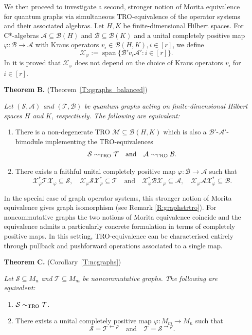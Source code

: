 \documentclass[11pt]{amsart}
\numberwithin{equation}{section}
\theoremstyle{plain}
\theoremstyle{definition}
\theoremstyle{remark}
\newcommand{\A}{{\mathcal{A}}}
\newcommand{\B}{{\mathcal{B}}}
\newcommand{\M}{{\mathcal{M}}}
\renewcommand{\S}{{\mathcal{S}}}
\newcommand{\T}{{\mathcal{T}}}
\newcommand{\X}{{\mathcal{X}}}
\newcommand\vphi{\varphi}
\newcommand{\qand}{\quad\text{and}\quad}
\newcommand{\spn}{\operatorname{span}}
\begin{document}
We then proceed to investigate a second, stronger notion of Morita equivalence for quantum graphs via simultaneous TRO-equivalence of the operator systems and their associated algebras. Let $H,K$ be finite-dimensional Hilbert spaces. For C*-algebras $\A\subseteq \B(H)$ and $\B\subseteq \B(K)$ and a unital completely positive map $\vphi \colon \B \to \A$ with Kraus operators $v_i \in \B(H,K), i\in[r]$, we define 
\[
\X_{\vphi}:= \spn\{\B' v_i \A':i\in [r]\}.
\]
In \cite[Proposition 6.1]{KL26} it is proved that $\X_\vphi$ does not depend on the choice of Kraus operators $v_i$ for $i\in [r]$.

\medskip

\noindent
{\bf Theorem B.} (Theorem~\ref{T:qgraphs_balanced})
{ \it Let $(\S,\A)$ and $(\T,\B)$ be quantum graphs acting on finite-dimensional Hilbert spaces
$H$ and $K$, respectively. The following are equivalent:
\begin{enumerate}
\item There is a non-degenerate TRO $\M\subseteq \B(H,K)$ which is also a $\B'$-$\A'$-bimodule implementing the TRO-equivalences
\[
\S \sim_{\rm TRO } \T \qand \A \sim_{\rm TRO } \B.
\]

\item There exists a faithful unital completely positive map $\vphi\colon\B\to \A$ such that
\[
\X_\vphi^*\T \X_\vphi\subseteq \S,\quad \X_\vphi \S \X_\vphi^*\subseteq \T 
\qand
\X_\vphi^*\B \X_\vphi\subseteq \A,\quad \X_\vphi \A \X_\vphi^*\subseteq \B.
\]
\end{enumerate}
}


In the special case of graph operator systems, this stronger notion of Morita equivalence gives graph isomorphism (see Remark \ref{R:graphstrtro}). For noncommutative graphs the two notions of Morita equivalence coincide and the equivalence admits a particularly concrete formulation in terms of completely positive maps. In this setting, TRO-equivalence can be characterised entirely through pullback and pushforward operations associated to a single map.

\medskip

\noindent
{\bf Theorem C.} (Corollary~\ref{T:ncgraphs})
{\it Let $\S \subseteq M_n$ and $\T \subseteq M_m$ be noncommutative graphs.  
The following are equivalent:
\begin{enumerate}
\item $\S \sim_{\rm TRO} \T$.
\item There exists a unital completely positive map $\vphi \colon M_m \to M_n$ such that 
\[
\S = \T^{\leftarrow \vphi} \qand 
\T = \S^{\rightarrow \vphi}.
\]
\end{enumerate}
}
\end{document}
